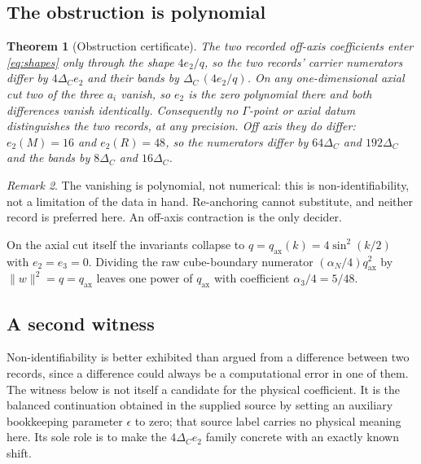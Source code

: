 \documentclass[11pt]{article}
\theoremstyle{plain}
\newtheorem{theorem}{Theorem}
\theoremstyle{definition}
\theoremstyle{remark}
\newtheorem{remark}[theorem]{Remark}
\newcommand{\chk}[1]{}
\begin{document}
\subsection{The obstruction is polynomial}

\begin{theorem}[Obstruction certificate]\label{thm:obstruction}
The two recorded off-axis coefficients enter \eqref{eq:shapes} only through
the shape $4e_2/q$, so the two records' carrier numerators differ by
$4\Delta_C e_2$ and their bands by $\Delta_C\,(4e_2/q)$. On any
one-dimensional axial cut two of the three $a_i$ vanish, so $e_2$ is the
\emph{zero polynomial} there and both differences vanish identically.
Consequently no $\Gamma$-point or axial datum distinguishes the two records,
at any precision. Off axis they do differ: $e_2(M)=16$ and $e_2(R)=48$, so the
numerators differ by $64\Delta_C$ and $192\Delta_C$ and the bands by
$8\Delta_C$ and $16\Delta_C$.
\end{theorem}
\chk{FINDING: the retained Gamma/axis data cannot identify C\_shp}
\chk{Phi\_C vanishes at Gamma along every direction}

\begin{remark}
The vanishing is polynomial, not numerical: this is non-identifiability, not a
limitation of the data in hand. Re-anchoring cannot substitute, and neither
record is preferred here. An off-axis contraction is the only decider.
\chk{the crosswalk is exactly scalar on the momentum axes}
\end{remark}

On the axial cut itself the invariants collapse to
$q=q_{\mathrm{ax}}(k)=4\sin^2(k/2)$ with $e_2=e_3=0$. Dividing the raw
cube-boundary numerator $(\alpha_N/4)q_{\mathrm{ax}}^2$ by
$\|w\|^2=q=q_{\mathrm{ax}}$ leaves one power of $q_{\mathrm{ax}}$ with
coefficient $\alpha_3/4=5/48$.
\chk{on an axial cut the mixed invariants vanish and the norm divides}

\subsection{A second witness}

Non-identifiability is better exhibited than argued from a difference between
two records, since a difference could always be a computational error in one of
them. The witness below is not itself a candidate for the physical
coefficient. It is the balanced continuation obtained in the supplied source
by setting an auxiliary bookkeeping parameter $\epsilon$ to zero; that source
label carries no physical meaning here. Its sole role is to make the
$4\Delta_Ce_2$ family concrete with an exactly known shift.
\end{document}
